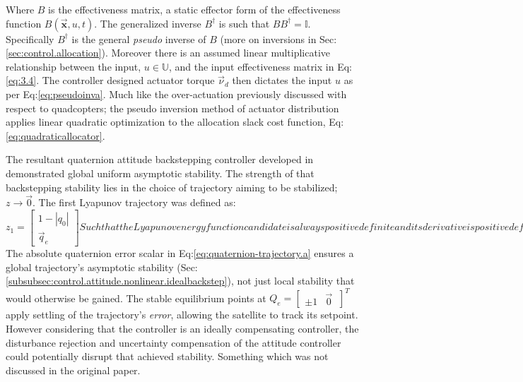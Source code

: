 Where $B$ is the effectiveness matrix, a static effector form of the effectiveness function $B(\vec{\mathbf{x}},u,t)$. The generalized inverse $B^{\dagger}$ is such that $BB^{\dagger}=\mathbb{I}$. Specifically $B^{\dagger}$ is the general \emph{pseudo} inverse of $B$ (more on inversions in Sec:\ref{sec:control.allocation}). Moreover there is an assumed linear multiplicative relationship between the input, $u\in\mathbb{U}$, and the input effectiveness matrix in Eq:\ref{eq:3.4}. The controller designed actuator torque $\vec{\nu}_d$ then dictates the input $u$ as per Eq:\ref{eq:pseudoinva}. Much like the over-actuation previously discussed with respect to quadcopters; the pseudo inversion method of actuator distribution applies linear quadratic optimization to the allocation slack cost function, Eq:\ref{eq:quadraticallocator}. 
\par
The resultant quaternion attitude backstepping controller developed in \cite{satellitebackstepping} demonstrated global uniform asymptotic stability. The strength of that backstepping stability lies in the choice of trajectory aiming to be stabilized; $z\rightarrow\vec{0}$. The first Lyapunov trajectory was defined as:
\begin{subequations}
\begin{equation}\label{eq:quaternion-trajectory.a}
z_1=\begin{bmatrix}
1-|q_0|\\
\vec{q}_e
\end{bmatrix}
\end{equation}
Such that the Lyapunov energy function candidate is always positive definite and its derivative is positive definite descrescent. The particulars of that stability proof are omitted but it is worth detailing their chosen candidate function;
\begin{equation}
V_1(z)=z_1\text{}^Tz_1>0~~~~\forall[q_0,\vec{q}_e]
\end{equation}
\end{subequations}
The absolute quaternion error scalar in Eq:\ref{eq:quaternion-trajectory.a} ensures a global trajectory's asymptotic stability (Sec:\ref{subsubsec:control.attitude.nonlinear.idealbackstep}), not just local stability that would otherwise be gained. The stable equilibrium points at $Q_e=\begin{bmatrix}
\pm 1 & \vec{0}~
\end{bmatrix}^T$ apply settling of the trajectory's \emph{error}, allowing the satellite to track its setpoint. However considering that the controller is an ideally compensating controller, the disturbance rejection and uncertainty compensation of the attitude controller could potentially disrupt that achieved stability. Something which was not discussed in the original paper.